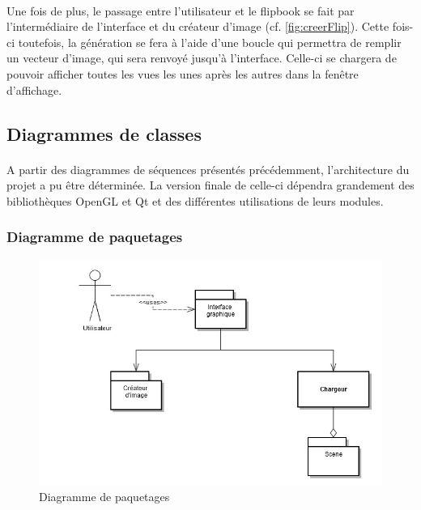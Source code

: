 \paragraph{}
Une fois de plus, le passage entre l’utilisateur et le flipbook se fait par l’intermédiaire de l’interface et du créateur d’image (cf. \ref{fig:creerFlip}). Cette fois-ci toutefois, la génération se fera à l’aide d’une boucle qui permettra de remplir un vecteur d’image, qui sera renvoyé jusqu’à l’interface. Celle-ci se chargera de pouvoir afficher toutes les vues les unes après les autres dans la fenêtre d’affichage.

\newpage

\subsection{Diagrammes de classes}

\paragraph{}
A partir des diagrammes de séquences présentés précédemment, l’architecture du projet a pu être déterminée. La version finale de celle-ci dépendra grandement des bibliothèques OpenGL et Qt et des différentes utilisations de leurs modules.

\subsubsection{Diagramme de paquetages}

\begin{figure}[h]
		\centering
		\includegraphics[scale=0.4]{diag_packages.jpg}
		\caption{\label{fig:diagPaquetage} Diagramme de paquetages}
\end{figure}

